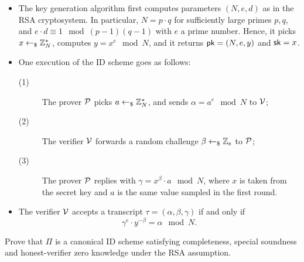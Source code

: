 \begin{itemize}
    \item The key generation algorithm first computes parameters $(N, e, d)$ as in the RSA cryptosystem. In particular, $N = p \cdot q$ for sufficiently large primes $p, q$, and $e \cdot d \equiv 1 \mod (p - 1)(q - 1)$ with $e$ a prime number. Hence, it picks $x \leftarrow_\$ \mathbb Z_N^*$, computes $y = x^e \mod N$, and it returns $\mathsf{pk} = (N, e, y)$ and $\mathsf{sk} = x$.
    \item One execution of the ID scheme goes as follows:
          \begin{description}
              \item[(1)] The prover $\mathcal{P}$ picks $a \leftarrow_\$ \mathbb Z_N^*$, and  sends $\alpha = a^e \mod N$ to $\mathcal{V}$;
              \item[(2)] The verifier $\mathcal{V}$ forwards a random challenge $\beta \leftarrow_\$ \mathbb Z_e$ to $\mathcal{P}$;
              \item[(3)] The prover $\mathcal{P}$ replies with $\gamma = x^\beta \cdot a \mod N$, where $x$ is taken from the secret key and $a$ is the same value sampled in the first round.
          \end{description}
    \item The verifier $\mathcal{V}$ accepts a transcript $\tau = (\alpha, \beta, \gamma)$ if and only if \[\gamma^e \cdot y^{-\beta} = \alpha \mod N.\]
\end{itemize}

Prove that $\Pi$ is a canonical ID scheme satisfying completeness, special soundness and honest-verifier zero knowledge under the RSA assumption.


